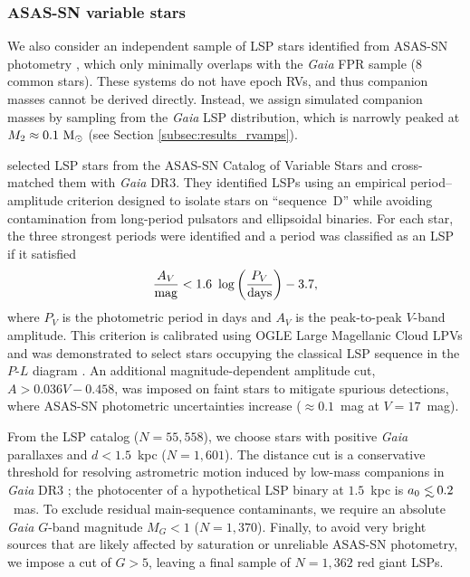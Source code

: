 \documentclass[trackchanges,twocolumn]{aastex631}
\begin{document}
\subsubsection{ASAS-SN variable stars}
\label{subsec:methodology_asas_sample}

We also consider an independent sample of LSP stars identified from ASAS-SN photometry \citep{Pawlak24}, which only minimally overlaps with the {\it Gaia} FPR sample (8 common stars). These systems do not have epoch RVs, and thus companion masses cannot be derived directly. Instead, we assign simulated companion masses by sampling from the {\it Gaia} LSP distribution, which is narrowly peaked at $M_2\approx0.1~{\rm M_\odot}$ (see Section \ref{subsec:results_rvamps}).

\citet{Pawlak24} selected LSP stars from the ASAS-SN Catalog of Variable Stars \citep{Jayasinghe18, Jayasinghe19} and cross-matched them with {\it Gaia} DR3. They identified LSPs using an empirical period--amplitude criterion designed to isolate stars on ``sequence~D'' \citep[e.g.,][]{Wood99} while avoiding contamination from long-period pulsators and ellipsoidal binaries. For each star, the three strongest periods were identified and a period was classified as an LSP if it satisfied
\begin{equation}\label{eq:asas_selection}
    \frac{A_V}{\rm mag} < 1.6~\log \left( \frac{P_V}{\rm days} \right) - 3.7,
\end{equation}
where $P_V$ is the photometric period in days and $A_V$ is the peak-to-peak $V$-band amplitude. This criterion is calibrated using OGLE Large Magellanic Cloud LPVs and was demonstrated to select stars occupying the classical LSP sequence in the $P$-$L$ diagram \citep{Pawlak24}. An additional magnitude-dependent amplitude cut, $A > 0.036V - 0.458$, was imposed on faint stars to mitigate spurious detections, where ASAS-SN photometric uncertainties increase ($\approx 0.1$~mag at $V=17$~mag).

From the \citet{Pawlak24} LSP catalog ($N=55{,}558$), we choose stars with positive {\it Gaia} parallaxes and $d<1.5$~kpc ($N=1{,}601$). The distance cut is a conservative threshold for resolving astrometric motion induced by low-mass companions in {\it Gaia} DR3 \citep[][]{ElBadry24}; the photocenter of a hypothetical LSP binary at $1.5$~kpc is $a_0\lsim0.2$~mas. To exclude residual main-sequence contaminants, we require an absolute {\it Gaia} $G$-band magnitude $M_G < 1$ ($N=1{,}370$). Finally, to avoid very bright sources that are likely affected by saturation or unreliable ASAS-SN photometry, we impose a cut of $G > 5$, leaving a final sample of $N=1{,}362$ red giant LSPs. 
\end{document}
